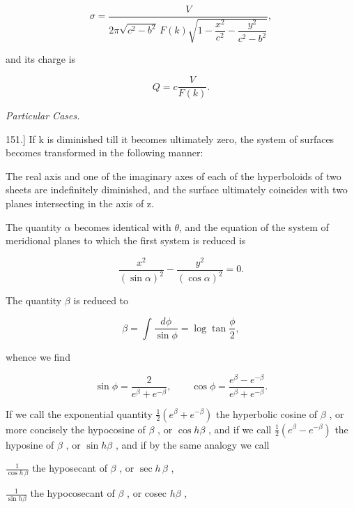 \documentclass[11pt,a4paper]{article}
\begin{document}
\begin{equation}\tag{30}
\sigma=\frac{V}
{2\pi\sqrt{c^2-b^2}\,F(k)
\sqrt{1-\dfrac{x^2}{c^2}-\dfrac{y^2}{c^2-b^2}}},
\end{equation}

and its charge is

\begin{equation}\tag{31}
Q=c\frac{V}{F(k)}.
\end{equation}

{\centering\itshape Particular Cases.\par}

151.] If k is diminished till it becomes ultimately zero, the system of surfaces becomes transformed in the following manner:

The real axis and one of the imaginary axes of each of the hyperboloids of two sheets are indefinitely diminished, and the surface ultimately coincides with two planes intersecting in the axis of z.

The quantity $\alpha$ becomes identical with $\theta$, and the equation of the system of meridional planes to which the first system is reduced is

\begin{equation}\tag{32}
\frac{x^2}{(\sin\alpha)^2}-\frac{y^2}{(\cos\alpha)^2}=0.
\end{equation}

The quantity  $\beta$  is reduced to

\begin{equation}\tag{33}
\beta = \int \frac{d\phi}{\sin \phi} = \log \tan \frac{\phi}{2},
\end{equation}

whence we find

\begin{equation}\tag{34}
\sin\phi=\frac{2}{e^\beta+e^{-\beta}},\qquad
\cos\phi=\frac{e^\beta-e^{-\beta}}{e^\beta+e^{-\beta}}.
\end{equation}

If we call the exponential quantity  $\frac{1}{2}(e^{\beta}+e^{-\beta})$  the hyperbolic cosine of  $\beta$ , or more concisely the hypocosine of  $\beta$ , or  $\cos h \beta$ , and if we call  $\frac{1}{2}(e^{\beta}-e^{-\beta})$  the hyposine of  $\beta$ , or  $\sin h \beta$ , and if by the same analogy we call

 $\frac{1}{\cos h \, \beta}$  the hyposecant of  $\beta$ , or  $\sec h \, \beta$ ,

 $\frac{1}{\sin h \beta}$  the hypocosecant of  $\beta$ , or cosec  $h \beta$ ,
\end{document}
